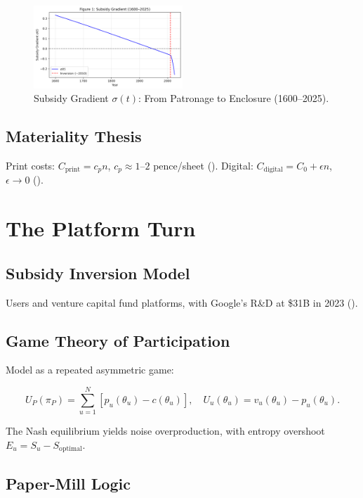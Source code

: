 \documentclass[12pt]{article}
\begin{document}
\begin{figure}[h]
\centering
\includegraphics[width=0.5\textwidth]{subsidy_gradient.png}
\caption{Subsidy Gradient \(\sigma(t)\): From Patronage to Enclosure (1600–2025).}
\label{fig:subsidy}
\end{figure}

\subsection{Materiality Thesis}

Print costs: \(C_{\text{print}} = c_p n\), \(c_p \approx 1–2\) pence/sheet (\citealp{Johns1998}). Digital: \(C_{\text{digital}} = C_0 + \epsilon n\), \(\epsilon \to 0\) (\citealp{Kittler1999}).

\section{The Platform Turn}

\subsection{Subsidy Inversion Model}

Users and venture capital fund platforms, with Google’s R&D at \$31B in 2023 (\citealp{Doctorow2023}).

\subsection{Game Theory of Participation}

Model as a repeated asymmetric game:

\[
U_P(\pi_P) = \sum_{u=1}^N [p_u(\theta_u) - c(\theta_u)], \quad U_u(\theta_u) = v_u(\theta_u) - p_u(\theta_u).
\]

The Nash equilibrium yields noise overproduction, with entropy overshoot \(E_u = S_u - S_{\text{optimal}}\).

\subsection{Paper-Mill Logic}
\end{document}
